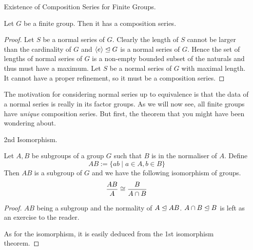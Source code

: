 \documentclass[../../book.tex]{subfiles}
\begin{document}
\begin{thm} Existence of Composition Series for Finite Groups.
    
    Let $G$ be a finite group.
    Then it has a composition series.
    
\end{thm}
\begin{proof}
    
    Let $S$ be a normal series of $G$.
    Clearly the length of $S$ cannot be larger than the cardinality of $G$
    and $\langle e\rangle \trianglelefteq G$ is a normal series of $G$.
    Hence the set of lengths of normal series of $G$ is a non-empty
    bounded subset of the naturals
    and thus must have a maximum. 
    Let $\hat{S}$ be a normal series of $G$ with maximal length. 
    It cannot have a proper refinement, so it must be a composition series.
    
\end{proof}

\begin{rmk}
    
    The motivation for considering normal series up to equivalence is that
    the data of a normal series is really in its factor groups.
    As we will now see, all finite groups have \emph{unique} composition series.
    But first, the theorem that you might have been wondering about.
    
\end{rmk}

\begin{thm} 2nd Isomorphism.
    
    Let $A, B$ be subgroups of a group $G$ such that
    $B$ is in the normaliser of $A$. 
    Define \[
        AB := \{ ab \mid a \in A, b \in B\}
    \]
    Then $AB$ is a subgroup of $G$ and we have the following isomorphism of groups. 
    \[
            \frac{AB}{A} \cong \frac{B}{A \cap B}
    \]
    
\end{thm}
\begin{proof}
    
    $AB$ being a subgroup and 
    the normality of $A \trianglelefteq AB$. $A \cap B \trianglelefteq B$
    is left as an exercise to the reader.
    
    As for the isomorphism, it is easily deduced from the 1st isomorphism theorem.
    
\end{proof}
\end{document}
